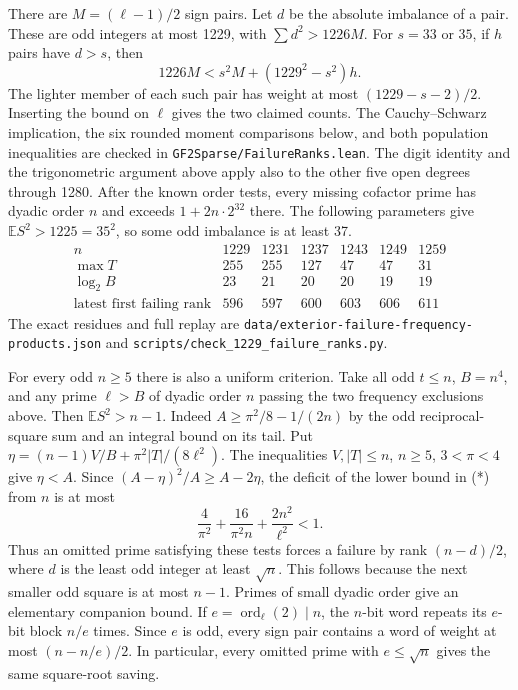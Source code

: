 \documentclass[11pt]{article}
\newcommand{\ord}{\operatorname{ord}}
\begin{document}
There are \(M=(\ell-1)/2\) sign pairs. Let \(d\) be the absolute
imbalance of a pair. These are odd integers at most 1229, with
\(\sum d^2>1226M\). For \(s=33\) or \(35\), if \(h\) pairs have
\(d>s\), then
\[
           1226M < s^2 M+(1229^2-s^2)h.
\]
The lighter member of each such pair has weight at most
\((1229-s-2)/2\). Inserting the bound on \(\ell\) gives the two
claimed counts. The Cauchy--Schwarz implication, the six rounded
moment comparisons below, and both population inequalities are
checked in \nolinkurl{GF2Sparse/FailureRanks.lean}. The digit identity
and the trigonometric argument above apply also to the other five open
degrees through 1280. After the known order tests, every missing
cofactor prime has dyadic order \(n\) and exceeds
\(1+2n\cdot2^{32}\) there. The following parameters give
\(\mathbb E S^2>1225=35^2\), so some odd imbalance is at least 37.
\[
\begin{array}{c|rrrrrr}
 n&1229&1231&1237&1243&1249&1259\\
 \max T&255&255&127&47&47&31\\
 \log_2 B&23&21&20&20&19&19\\
 \text{latest first failing rank}&596&597&600&603&606&611
\end{array}
\]
The exact residues and full replay are
\nolinkurl{data/exterior-failure-frequency-products.json} and
\nolinkurl{scripts/check_1229_failure_ranks.py}.

For every odd \(n\ge5\) there is also a uniform criterion. Take all
odd \(t\le n\), \(B=n^4\), and any prime \(\ell>B\) of dyadic order
\(n\) passing the two frequency exclusions above. Then
\(\mathbb E S^2>n-1\). Indeed
\(A\ge\pi^2/8-1/(2n)\) by the odd reciprocal-square sum and an
integral bound on its tail. Put
\(\eta=(n-1)V/B+\pi^2|T|/(8\ell^2)\). The inequalities
\(V,|T|\le n\), \(n\ge5\), \(3<\pi<4\) give \(\eta<A\).
Since \((A-\eta)^2/A\ge A-2\eta\), the deficit of the lower
bound in (*) from \(n\) is at most
\[
    \frac4{\pi^2}+\frac{16}{\pi^2 n}+\frac{2n^2}{\ell^2}<1 .
\]
Thus an omitted prime satisfying these tests forces a failure by rank
\((n-d)/2\), where \(d\) is the least odd integer at least \(\sqrt n\).
This follows because the next smaller odd square is at most \(n-1\).
Primes of small dyadic order give an elementary companion bound. If
\(e=\ord_\ell(2)\mid n\), the \(n\)-bit word repeats its \(e\)-bit
block \(n/e\) times. Since \(e\) is odd, every sign pair contains
a word of weight at most \((n-n/e)/2\). In particular, every omitted
prime with \(e\le\sqrt n\) gives the same square-root saving.
\end{document}

